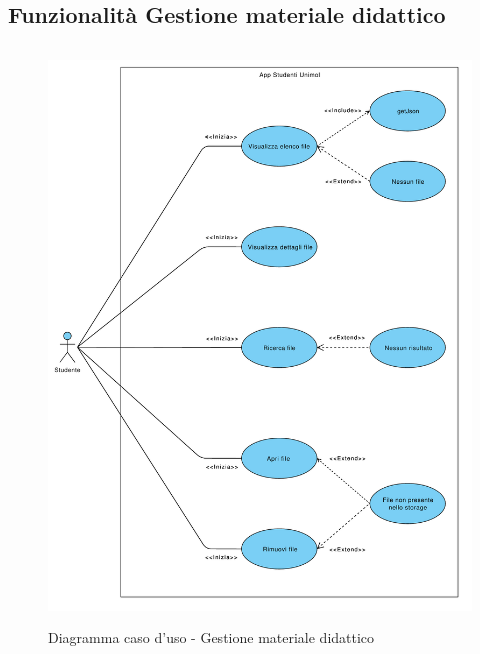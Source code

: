 \subsection{Funzionalità Gestione materiale didattico}
\begin{figure}[h]
	\includegraphics[width=6.5in, height=6in]{imgs/gruppo1/use_case_diagrams/UCD3-materiale_didattico.pdf}
	\caption{Diagramma caso d'uso - Gestione materiale didattico}
	\label{diag:gestioneMatDidattico}
\end{figure}

\clearpage